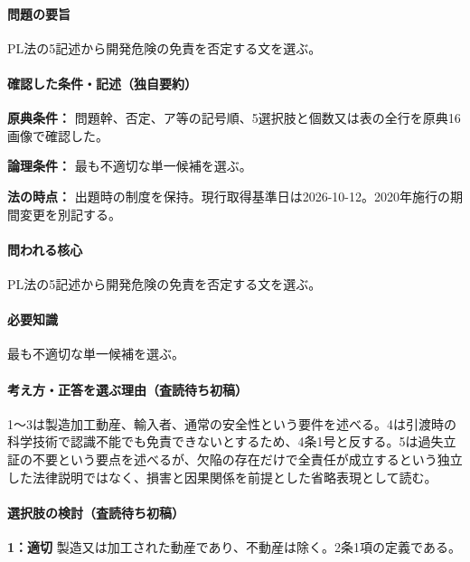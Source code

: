 \paragraph{問題の要旨} PL法の5記述から開発危険の免責を否定する文を選ぶ。

\paragraph{確認した条件・記述（独自要約）}\mbox{}\par

\noindent\textbf{原典条件：} 問題幹、否定、ア等の記号順、5選択肢と個数又は表の全行を原典16画像で確認した。\par

\noindent\textbf{論理条件：} 最も不適切な単一候補を選ぶ。\par

\noindent\textbf{法の時点：} 出題時の制度を保持。現行取得基準日は2026-10-12。2020年施行の期間変更を別記する。\par

\paragraph{問われる核心} PL法の5記述から開発危険の免責を否定する文を選ぶ。

\paragraph{必要知識} 最も不適切な単一候補を選ぶ。

\paragraph{考え方・正答を選ぶ理由（査読待ち初稿）} 1〜3は製造加工動産、輸入者、通常の安全性という要件を述べる。4は引渡時の科学技術で認識不能でも免責できないとするため、4条1号と反する。5は過失立証の不要という要点を述べるが、欠陥の存在だけで全責任が成立するという独立した法律説明ではなく、損害と因果関係を前提とした省略表現として読む。

\paragraph{選択肢の検討（査読待ち初稿）}\mbox{}\par

\noindent\textbf{1：適切} 製造又は加工された動産であり、不動産は除く。2条1項の定義である。\par

